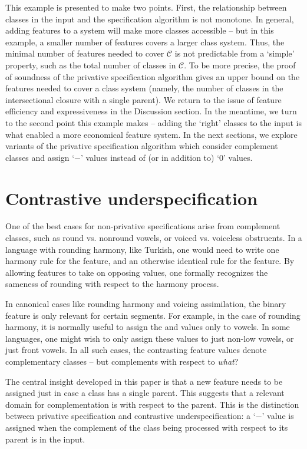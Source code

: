 \documentclass[11pt, oneside]{article}   	%
\begin{document}
This example is presented to make two points. First, the relationship between classes in the input and the specification algorithm is not monotone. In general, adding features to a system will make more classes accessible -- but in this example, a smaller number of features covers a larger class system. Thus, the minimal number of features needed to cover $\mathcal C$ is not predictable from a `simple' property, such as the total number of classes in $\mathcal C$. To be more precise, the proof of soundness of the privative specification algorithm gives an upper bound on the features needed to cover a class system (namely, the number of classes in the intersectional closure with a single parent). We return to the issue of feature efficiency and expressiveness in the Discussion section. In the meantime, we turn to the second point this example makes -- adding the `right' classes to the input is what enabled a more economical feature system. In the next sections, we explore variants of the privative specification algorithm which consider complement classes and assign `$-$' values instead of (or in addition to) `$0$' values. 

\section{Contrastive underspecification}

One of the best cases for non-privative specifications arise from complement classes, such as round vs. nonround vowels, or voiced vs. voiceless obstruents. In a language with rounding harmony, like Turkish, one would need to write one harmony rule for the  feature, and an otherwise identical rule for the  feature. By allowing features to take on opposing values, one formally recognizes the sameness of rounding with respect to the harmony process.

In canonical cases like rounding harmony and voicing assimilation, the binary feature is only relevant for certain segments. For example, in the case of rounding harmony, it is normally useful to assign the  and  values only to vowels. In some languages, one might wish to only assign these values to just non-low vowels, or just front vowels. In all such cases, the contrasting feature values denote complementary classes -- but complements with respect to \textit{what}?

The central insight developed in this paper is that a new feature needs to be assigned just in case a class has a single parent. This suggests that a relevant domain for complementation is with respect to the parent. This is the distinction between privative specification and contrastive underspecification: a `$-$' value is assigned when the complement of the class being processed with respect to its parent is in the input.
\end{document}
